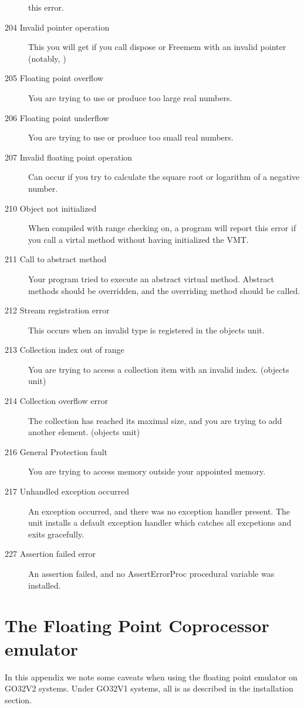 \documentclass{report}
\begin{document}
\begin{description}
this error.
\item [204  Invalid pointer operation]
This you will get if you call dispose or Freemem with an invalid pointer
(notably, )
\item [205  Floating point overflow]
You are trying to use or produce too large real numbers.
\item [206  Floating point underflow]
You are trying to use or produce too small real numbers.
\item [207  Invalid floating point operation]
Can occur if you try to calculate the square root or logarithm of a negative
number.
\item [210  Object not initialized]
When compiled with range checking on, a program will report this error if
you call a virtal method without having initialized the VMT.
\item [211  Call to abstract method]
Your program tried to execute an abstract virtual method. Abstract methods
should be overridden, and the overriding method should be called.
\item [212  Stream registration error]
This occurs when an invalid type is registered in the objects unit.
\item [213  Collection index out of range]
You are trying to access a collection item with an invalid index.
(objects unit)
\item [214  Collection overflow error]
The collection has reached its maximal size, and you are trying to add
another element. (objects unit)
\item [216  General Protection fault]
You are trying to access memory outside your appointed memory.
\item [217 Unhandled exception occurred]
An exception occurred, and there was no exception handler present.
The  unit installs a default exception handler which catches
all excpetions and exits gracefully.
\item [227 Assertion failed error]
An assertion failed, and no AssertErrorProc procedural variable was installed.
\end{description}


\chapter{The Floating Point Coprocessor emulator}

In this appendix we note some caveats when using the floating point
emulator on GO32V2 systems. Under GO32V1 systems, all is as described in
the installation section.
\end{document}
